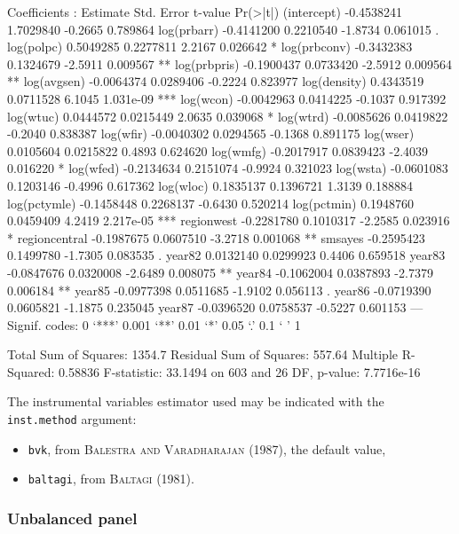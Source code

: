 \documentclass[a4paper]{article}
\begin{document}
\begin{Schunk}
\begin{Soutput}
Coefficients :
                Estimate Std. Error t-value  Pr(>|t|)    
(intercept)   -0.4538241  1.7029840 -0.2665  0.789864    
log(prbarr)   -0.4141200  0.2210540 -1.8734  0.061015 .  
log(polpc)     0.5049285  0.2277811  2.2167  0.026642 *  
log(prbconv)  -0.3432383  0.1324679 -2.5911  0.009567 ** 
log(prbpris)  -0.1900437  0.0733420 -2.5912  0.009564 ** 
log(avgsen)   -0.0064374  0.0289406 -0.2224  0.823977    
log(density)   0.4343519  0.0711528  6.1045 1.031e-09 ***
log(wcon)     -0.0042963  0.0414225 -0.1037  0.917392    
log(wtuc)      0.0444572  0.0215449  2.0635  0.039068 *  
log(wtrd)     -0.0085626  0.0419822 -0.2040  0.838387    
log(wfir)     -0.0040302  0.0294565 -0.1368  0.891175    
log(wser)      0.0105604  0.0215822  0.4893  0.624620    
log(wmfg)     -0.2017917  0.0839423 -2.4039  0.016220 *  
log(wfed)     -0.2134634  0.2151074 -0.9924  0.321023    
log(wsta)     -0.0601083  0.1203146 -0.4996  0.617362    
log(wloc)      0.1835137  0.1396721  1.3139  0.188884    
log(pctymle)  -0.1458448  0.2268137 -0.6430  0.520214    
log(pctmin)    0.1948760  0.0459409  4.2419 2.217e-05 ***
regionwest    -0.2281780  0.1010317 -2.2585  0.023916 *  
regioncentral -0.1987675  0.0607510 -3.2718  0.001068 ** 
smsayes       -0.2595423  0.1499780 -1.7305  0.083535 .  
year82         0.0132140  0.0299923  0.4406  0.659518    
year83        -0.0847676  0.0320008 -2.6489  0.008075 ** 
year84        -0.1062004  0.0387893 -2.7379  0.006184 ** 
year85        -0.0977398  0.0511685 -1.9102  0.056113 .  
year86        -0.0719390  0.0605821 -1.1875  0.235045    
year87        -0.0396520  0.0758537 -0.5227  0.601153    
---
Signif. codes:  0 ‘***’ 0.001 ‘**’ 0.01 ‘*’ 0.05 ‘.’ 0.1 ‘ ’ 1 

Total Sum of Squares: 1354.7
Residual Sum of Squares: 557.64
Multiple R-Squared: 0.58836
F-statistic: 33.1494 on 603 and 26 DF, p-value: 7.7716e-16
\end{Soutput}
\end{Schunk}

The instrumental variables estimator used may be indicated with the
\texttt{inst.method} argument:
\begin{itemize}
\item \texttt{bvk}, from  \textsc{Balestra and Varadharajan} (1987), the default value,
\item \texttt{baltagi}, from \textsc{Baltagi} (1981).
\end{itemize}


\subsubsection{Unbalanced panel}
\end{document}
